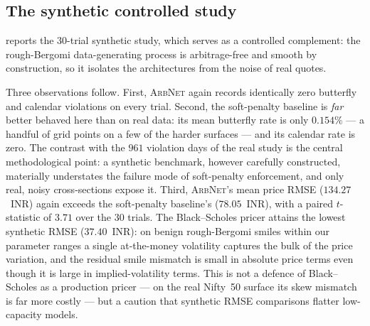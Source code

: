 \documentclass[largeformat]{interact}
\theoremstyle{plain}
\theoremstyle{definition}
\newcommand{\arbnet}{\textsc{ArbNet}}
\newcommand{\bs}{Black--Scholes}
\begin{document}
\subsection{The synthetic controlled study}
\label{sec:synth-result}

 reports the $30$-trial synthetic study, which serves as a controlled complement: the rough-Bergomi data-generating process is arbitrage-free and smooth by construction, so it isolates the architectures from the noise of real quotes.

Three observations follow. First, \arbnet{} again records identically zero butterfly and calendar violations on every trial. Second, the soft-penalty baseline is \emph{far} better behaved here than on real data: its mean butterfly rate is only $0.154\%$ --- a handful of grid points on a few of the harder surfaces --- and its calendar rate is zero. The contrast with the $961$ violation days of the real study is the central methodological point: a synthetic benchmark, however carefully constructed, materially understates the failure mode of soft-penalty enforcement, and only real, noisy cross-sections expose it. Third, \arbnet{}'s mean price RMSE ($134.27$~INR) again exceeds the soft-penalty baseline's ($78.05$~INR), with a paired $t$-statistic of $3.71$ over the $30$ trials. The \bs{} pricer attains the lowest synthetic RMSE ($37.40$~INR): on benign rough-Bergomi smiles within our parameter ranges a single at-the-money volatility captures the bulk of the price variation, and the residual smile mismatch is small in absolute price terms even though it is large in implied-volatility terms. This is not a defence of \bs{} as a production pricer --- on the real Nifty~50 surface its skew mismatch is far more costly --- but a caution that synthetic RMSE comparisons flatter low-capacity models.
\end{document}
